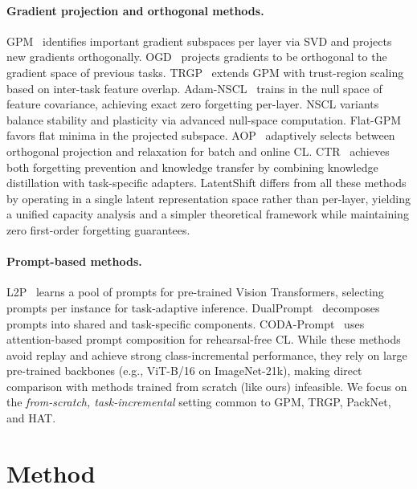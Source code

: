 \documentclass{article}
\begin{document}
\paragraph{Gradient projection and orthogonal methods.}
GPM~\citep{saha2021gradient} identifies important gradient subspaces per layer
via SVD and projects new gradients orthogonally.
OGD~\citep{farajtabar2020orthogonal} projects gradients to be orthogonal to
the gradient space of previous tasks. TRGP~\citep{lin2022trgp} extends GPM with
trust-region scaling based on inter-task feature overlap.
Adam-NSCL~\citep{wang2021training} trains in the null space of feature
covariance, achieving exact zero forgetting per-layer. NSCL
variants~\citep{kong2022balancing} balance stability and plasticity via advanced
null-space computation. Flat-GPM~\citep{deng2021flattening} favors flat minima
in the projected subspace.
AOP~\citep{guo2022adaptive} adaptively selects between orthogonal projection
and relaxation for batch and online CL.
CTR~\citep{ke2021achieving} achieves both forgetting prevention and knowledge
transfer by combining knowledge distillation with task-specific adapters.
LatentShift differs from all these methods by operating in a single latent
representation space rather than per-layer, yielding a unified capacity analysis
and a simpler theoretical framework while maintaining zero first-order
forgetting guarantees.

\paragraph{Prompt-based methods.}
L2P~\citep{wang2022learning} learns a pool of prompts for pre-trained Vision
Transformers, selecting prompts per instance for task-adaptive inference.
DualPrompt~\citep{wang2022dualprompt} decomposes prompts into shared and
task-specific components. CODA-Prompt~\citep{smith2023coda} uses attention-based
prompt composition for rehearsal-free CL. While these methods avoid replay and
achieve strong class-incremental performance, they rely on large pre-trained
backbones (e.g., ViT-B/16 on ImageNet-21k), making direct comparison with
methods trained from scratch (like ours) infeasible. We focus on the
\emph{from-scratch, task-incremental} setting common to GPM, TRGP, PackNet,
and HAT.

\section{Method}
\label{sec:method}
\end{document}
